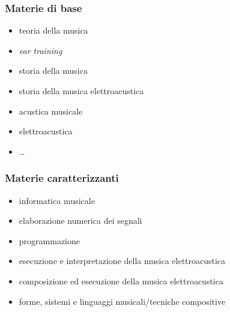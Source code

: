 \begin{frame}
  \frametitle<+->{Materie di base}

	\begin{itemize}

    \item teoria della musica

    \item \emph{ear training}

    \item storia della musica

    \item storia della musica elettroacustica

    \item acustica musicale

    \item elettroacustica

    \item \ldots

	\end{itemize}

\end{frame}

\begin{frame}
  \frametitle<+->{Materie caratterizzanti}

	\begin{itemize}

    \item informatica musicale

    \item elaborazione numerica dei segnali

    \item programmazione

    \item esecuzione e interpretazione della musica elettroacustica

    \item composizione ed esecuzione della musica elettroacustica

    \item forme, sistemi e linguaggi musicali/tecniche compositive

	\end{itemize}

\end{frame}

